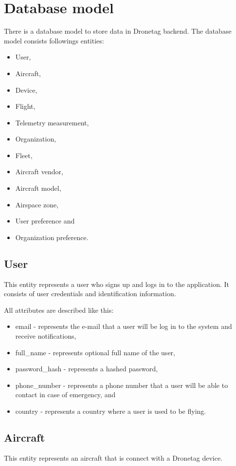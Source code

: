\section{Database model}\label{sec:database-model}
There is a database model to store data in Dronetag backend.
The database model consists followings entities:
\begin{itemize}
    \item User,
    \item Aircraft,
    \item Device,
    \item Flight,
    \item Telemetry measurement,
    \item Organization,
    \item Fleet,
    \item Aircraft vendor,
    \item Aircraft model,
    \item Airspace zone,
    \item User preference and
    \item Organization preference.
\end{itemize}

\subsection{User}\label{subsec:user}
This entity represents a user who signs up and logs in to the application.
It consists of user credentials and identification information.

All attributes are described like this:
\begin{itemize}
    \item email - represents the e-mail that a user will be log in to the system and receive notifications,
    \item full\_name - represents optional full name of the user,
    \item password\_hash - represents a hashed password,
    \item phone\_number - represents a phone number that a user will be able to contact in case of emergency, and
    \item country - represents a country where a user is used to be flying.
\end{itemize}

\subsection{Aircraft}\label{subsec:aircraft}
This entity represents an aircraft that is connect with a Dronetag device.

